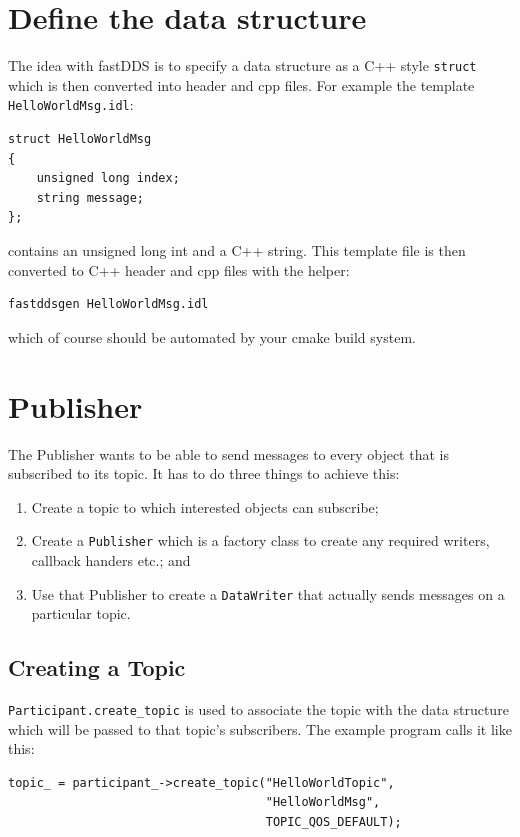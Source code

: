 \documentclass[12pt]{report}
\begin{document}
\section{Define the data structure}

The idea with fastDDS is to specify a data structure as a C++ style
\texttt{struct} which is then converted into header and cpp files.
For example the template \texttt{HelloWorldMsg.idl}:
\begin{verbatim}
struct HelloWorldMsg
{
    unsigned long index;
    string message;
};
\end{verbatim}
contains an unsigned long int and a C++ string. This template file is then
converted to C++ header and cpp files with the helper:
\begin{verbatim}
fastddsgen HelloWorldMsg.idl
\end{verbatim}
which of course should be automated by your cmake build system.

\section{Publisher}
The Publisher wants to be able to send messages to every object that is
subscribed to its topic. It has to do three things to achieve this:
\begin{enumerate}
 \item Create a topic to which interested objects can subscribe;
 \item Create a \texttt{Publisher} which is a factory class to create any required
  writers, callback handers etc.; and
 \item Use that Publisher to create a \texttt{DataWriter} that actually
  sends messages on a particular topic.
\end{enumerate}

\subsection{Creating a Topic}

\texttt{Participant.create\_topic} is used to associate the topic with the
data structure which will be passed to that topic's subscribers.
The example program calls it like this:
\begin{verbatim}
topic_ = participant_->create_topic("HelloWorldTopic",
                                    "HelloWorldMsg",
                                    TOPIC_QOS_DEFAULT);
\end{verbatim}
\end{document}
